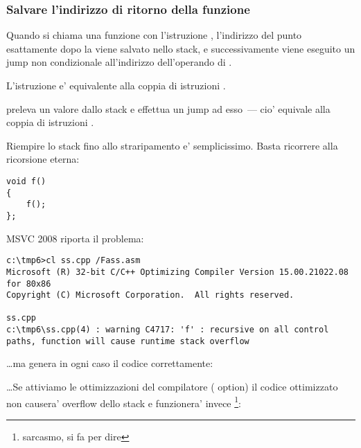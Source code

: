\subsubsection{Salvare l'indirizzo di ritorno della funzione}


Quando si chiama una funzione con l'istruzione \CALL, l'indirizzo del punto esattamente dopo la \CALL viene salvato nello stack, e successivamente
viene eseguito un jump non condizionale all'indirizzo dell'operando di \CALL.

L'istruzione \CALL e' equivalente alla coppia di istruzioni .

\RET preleva un valore dallo stack e effettua un jump ad esso~--- cio' equivale alla coppia di istruzioni .

\myindex{\Stack!\MLStackOverflow}
\myindex{\Recursion}

Riempire lo stack fino allo straripamento e' semplicissimo. Basta ricorrere alla ricorsione eterna:

\begin{lstlisting}[style=customc]
void f()
{
	f();
};
\end{lstlisting}

MSVC 2008 riporta il problema:

\begin{lstlisting}
c:\tmp6>cl ss.cpp /Fass.asm
Microsoft (R) 32-bit C/C++ Optimizing Compiler Version 15.00.21022.08 for 80x86
Copyright (C) Microsoft Corporation.  All rights reserved.

ss.cpp
c:\tmp6\ss.cpp(4) : warning C4717: 'f' : recursive on all control paths, function will cause runtime stack overflow
\end{lstlisting}

\dots ma genera in ogni caso il codice correttamente:



\dots Se attiviamo le ottimizzazioni del compilatore (\TT{\Ox} option) il codice ottimizzato non causera' overflow dello stack 
e funzionera' invece \footnote{sarcasmo, si fa per dire}:



